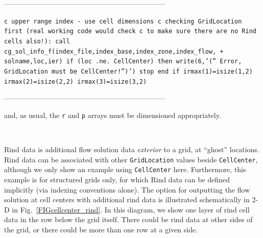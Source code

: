 \documentclass[12pt]{article}
\begin{document}
--------------------------------------------------------------------

{\tt \noindent c   upper range index - use cell dimensions
\newline c   checking GridLocation first (real working code would check
\newline c   to make sure there are no Rind cells also!):
\newline\indent      call cg\_sol\_info\_f(index\_file,index\_base,index\_zone,index\_flow,
\newline + \indent solname,loc,ier)
\newline\indent      if (loc .ne. CellCenter) then
\newline\indent\indent        write(6,'('' Error, GridLocation must be CellCenter!'')')
\newline\indent\indent        stop
\newline\indent      end if
\newline\indent      irmax(1)=isize(1,2)
\newline\indent      irmax(2)=isize(2,2)
\newline\indent      irmax(3)=isize(3,2)}

--------------------------------------------------------------------

\noindent and, as usual, the {\tt r} and {\tt p} arrays must be dimensioned 
appropriately.

~

\noindent{}

Rind data is additional flow solution data {\it exterior} to a
grid, at ``ghost'' locations.  Rind data
can be associated with other {\tt GridLocation} values
beside {\tt CellCenter}, although we only show an example
using {\tt CellCenter} here.
Furthermore, this example is for structured grids only, for which Rind
data can be defined implicitly (via indexing conventions alone).
The option for outputting the flow solution at cell centers
with additional rind data is illustrated schematically in 2-D in
Fig.~\ref{FIGcellcenter_rind}.  In this diagram, we show one layer
of rind cell data in the row below the grid itself.  There could be
rind data at other sides of the grid, or there could be
more than one row at a given side.  
\end{document}
